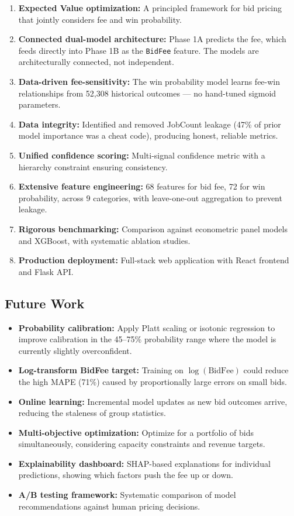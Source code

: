 \documentclass[12pt,a4paper]{article}
\begin{document}
\begin{enumerate}[nosep]
    \item \textbf{Expected Value optimization:} A principled framework for bid pricing that jointly considers fee and win probability.
    \item \textbf{Connected dual-model architecture:} Phase 1A predicts the fee, which feeds directly into Phase 1B as the \texttt{BidFee} feature. The models are architecturally connected, not independent.
    \item \textbf{Data-driven fee-sensitivity:} The win probability model learns fee-win relationships from 52,308 historical outcomes --- no hand-tuned sigmoid parameters.
    \item \textbf{Data integrity:} Identified and removed JobCount leakage (47\% of prior model importance was a cheat code), producing honest, reliable metrics.
    \item \textbf{Unified confidence scoring:} Multi-signal confidence metric with a hierarchy constraint ensuring consistency.
    \item \textbf{Extensive feature engineering:} 68 features for bid fee, 72 for win probability, across 9 categories, with leave-one-out aggregation to prevent leakage.
    \item \textbf{Rigorous benchmarking:} Comparison against econometric panel models and XGBoost, with systematic ablation studies.
    \item \textbf{Production deployment:} Full-stack web application with React frontend and Flask API.
\end{enumerate}

\subsection{Future Work}

\begin{itemize}[nosep]
    \item \textbf{Probability calibration:} Apply Platt scaling or isotonic regression to improve calibration in the 45--75\% probability range where the model is currently slightly overconfident.
    \item \textbf{Log-transform BidFee target:} Training on $\log(\text{BidFee})$ could reduce the high MAPE (71\%) caused by proportionally large errors on small bids.
    \item \textbf{Online learning:} Incremental model updates as new bid outcomes arrive, reducing the staleness of group statistics.
    \item \textbf{Multi-objective optimization:} Optimize for a portfolio of bids simultaneously, considering capacity constraints and revenue targets.
    \item \textbf{Explainability dashboard:} SHAP-based explanations for individual predictions, showing which factors push the fee up or down.
    \item \textbf{A/B testing framework:} Systematic comparison of model recommendations against human pricing decisions.
\end{itemize}
\end{document}
